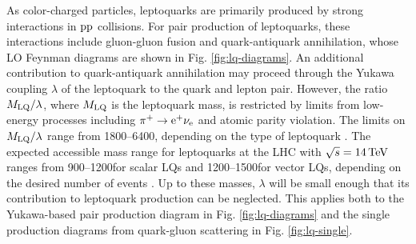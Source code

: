 As color-charged particles, leptoquarks are primarily produced by strong interactions in $\mathrm{p}\mathrm{p}$ collisions. For pair production of leptoquarks, these interactions include gluon-gluon fusion and quark-antiquark annihilation, whose LO Feynman diagrams are shown in Fig. \ref{fig:lq-diagrams}. An additional contribution to quark-antiquark annihilation may proceed through the Yukawa coupling $\lambda$ of the leptoquark to the quark and lepton pair. However, the ratio $M_{\text{LQ}}/\lambda$, where $M_{\text{LQ}}$ is the leptoquark mass, is restricted by limits from low-energy processes including $\pi^{+} \rightarrow \mathrm{e}^{+} \nu_{\mathrm{e}}$ and atomic parity violation. The limits on $M_{\text{LQ}}/\lambda$ range from 1800--6400\GeVcc, depending on the type of leptoquark \cite{Leurer:1993em, MuchAdo, LQreview}. The expected accessible mass range for leptoquarks at the LHC with $\sqrt{s}=14\,\text{Te\hspace{-.08em}V}$ ranges from 900--1200\GeVcc for scalar LQs and 1200--1500\GeVcc for vector LQs, depending on the desired number of events \cite{LQPairHad}. Up to these masses, $\lambda$ will be small enough that its contribution to leptoquark production can be neglected. This applies both to the Yukawa-based pair production diagram in Fig. \ref{fig:lq-diagrams} and the single production diagrams from quark-gluon scattering in Fig. \ref{fig:lq-single}.

